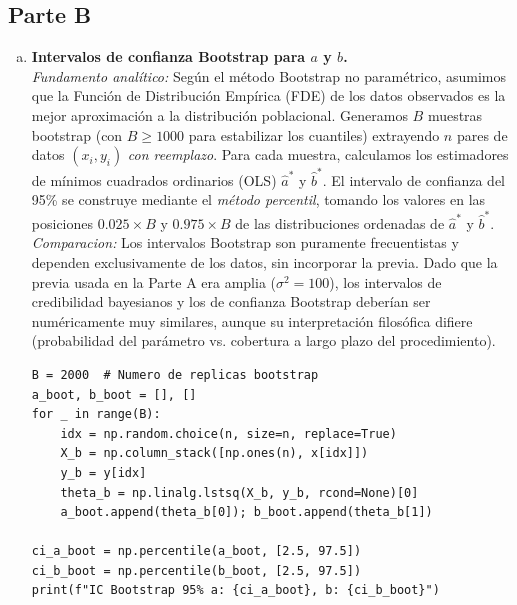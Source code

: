 \documentclass[a4paper]{article}
\begin{document}
\subsection{Parte B}
\begin{enumerate}[a)]
\item \textbf{Intervalos de confianza Bootstrap para $a$ y $b$.} \\
\textit{Fundamento analítico:} Según el método Bootstrap no paramétrico, asumimos que la Función de Distribución Empírica (FDE) de los datos observados es la mejor aproximación a la distribución poblacional. Generamos $B$ muestras bootstrap (con $B \ge 1000$ para estabilizar los cuantiles) extrayendo $n$ pares de datos $(x_i, y_i)$ \textit{con reemplazo}. Para cada muestra, calculamos los estimadores de mínimos cuadrados ordinarios (OLS) $\hat{a}^*$ y $\hat{b}^*$. El intervalo de confianza del 95\% se construye mediante el \textit{método percentil}, tomando los valores en las posiciones $0.025 \times B$ y $0.975 \times B$ de las distribuciones ordenadas de $\hat{a}^*$ y $\hat{b}^*$. \\
\textit{Comparacion:} Los intervalos Bootstrap son puramente frecuentistas y dependen exclusivamente de los datos, sin incorporar la previa. Dado que la previa usada en la Parte A era amplia ($\sigma^2=100$), los intervalos de credibilidad bayesianos y los de confianza Bootstrap deberían ser numéricamente muy similares, aunque su interpretación filosófica difiere (probabilidad del parámetro vs. cobertura a largo plazo del procedimiento).

\begin{lstlisting}
B = 2000  # Numero de replicas bootstrap
a_boot, b_boot = [], []
for _ in range(B):
    idx = np.random.choice(n, size=n, replace=True)
    X_b = np.column_stack([np.ones(n), x[idx]])
    y_b = y[idx]
    theta_b = np.linalg.lstsq(X_b, y_b, rcond=None)[0]
    a_boot.append(theta_b[0]); b_boot.append(theta_b[1])

ci_a_boot = np.percentile(a_boot, [2.5, 97.5])
ci_b_boot = np.percentile(b_boot, [2.5, 97.5])
print(f"IC Bootstrap 95% a: {ci_a_boot}, b: {ci_b_boot}")
\end{lstlisting}


\end{enumerate}
\end{document}
